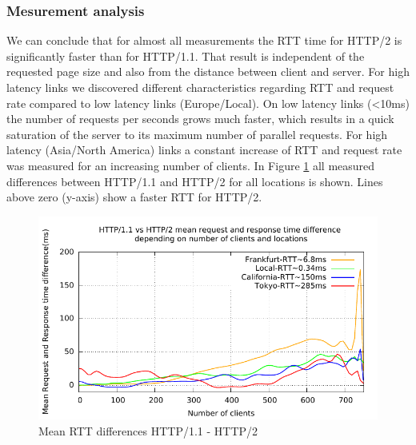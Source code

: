 \subsubsection{Mesurement analysis}

We can conclude that for almost all measurements the RTT time for HTTP/2 is significantly faster than for HTTP/1.1. That result is independent of the requested page size and also from the distance between client and server. For high latency links we discovered different characteristics regarding RTT and request rate compared to low latency links (Europe/Local). On low latency links (\textless 10ms) the number of requests per seconds grows much faster, which results in a quick saturation of the server to its maximum number of parallel requests. For high latency (Asia/North America) links a constant increase of RTT and request rate was measured for an increasing number of clients. In Figure \ref{fig:latency-all} all measured differences between HTTP/1.1 and HTTP/2 for all locations is shown. Lines above zero (y-axis) show a faster RTT for HTTP/2.

\begin{figure}[H]
	\centering
	\includegraphics[scale=1,trim=0.0cm .0cm .0cm .0cm,clip]{images/difflatency.pdf}
	\caption{Mean RTT differences HTTP/1.1 - HTTP/2}
	\label{fig:latency-all}
\end{figure}

\newpage
